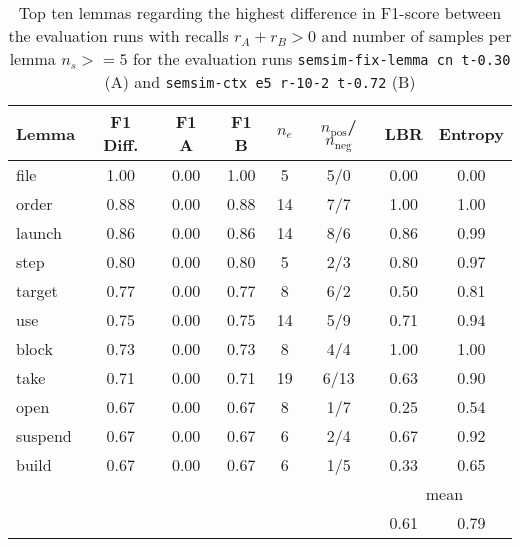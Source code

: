 \documentclass[11pt]{scrreprt}
\begin{document}
{\begin{table}[p]
\centering
\begin{tabular}{lccccccc}
\toprule
Lemma      & F1 Diff. & F1 A & F1 B & \(n_e\) & \(n_\text{pos}\)/\(n_\text{neg}\) & LBR & Entropy \\
\midrule
file       & 1.00      & 0.00           & 1.00           & 5               & 5/0     & 0.00 & 0.00 \\
order      & 0.88      & 0.00           & 0.88           & 14              & 7/7     & 1.00 & 1.00 \\
launch     & 0.86      & 0.00           & 0.86           & 14              & 8/6     & 0.86 & 0.99 \\
step       & 0.80      & 0.00           & 0.80           & 5               & 2/3     & 0.80 & 0.97 \\
target     & 0.77      & 0.00           & 0.77           & 8               & 6/2     & 0.50 & 0.81 \\
use        & 0.75      & 0.00           & 0.75           & 14              & 5/9     & 0.71 & 0.94 \\
block      & 0.73      & 0.00           & 0.73           & 8               & 4/4     & 1.00 & 1.00 \\
take       & 0.71      & 0.00           & 0.71           & 19              & 6/13    & 0.63 & 0.90 \\
open       & 0.67      & 0.00           & 0.67           & 8               & 1/7     & 0.25 & 0.54 \\
suspend    & 0.67      & 0.00           & 0.67           & 6               & 2/4     & 0.67 & 0.92 \\
build      & 0.67      & 0.00           & 0.67           & 6               & 1/5     & 0.33 & 0.65 \\
\cmidrule{7-8}
\multicolumn{6}{l}{} & \multicolumn{2}{c}{mean} \\
\multicolumn{6}{l}{} & 0.61 & 0.79 \\
\bottomrule
\end{tabular}
\caption{Top ten lemmas regarding the highest difference in F1-score between the evaluation runs with recalls \(r_A + r_B > 0\) and number of samples per lemma \(n_s >= 5\) for the evaluation runs \texttt{semsim-fix-lemma cn t-0.30} (A) and \texttt{semsim-ctx e5 r-10-2 t-0.72} (B)}
\label{tab:predicate-lemma-highest-f1}
\end{table}

}
\end{document}

